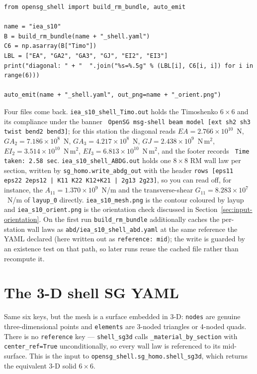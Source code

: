 \begin{lstlisting}[style=opensg,caption={The whole compute part of beam\_homo\_shell.py.},basicstyle=\ttfamily\footnotesize]
from opensg_shell import build_rm_bundle, auto_emit

name = "iea_s10"
B = build_rm_bundle(name + "_shell.yaml")
C6 = np.asarray(B["Timo"])
LBL = ["EA", "GA2", "GA3", "GJ", "EI2", "EI3"]
print("diagonal: " + "  ".join("%s=%.5g" % (LBL[i], C6[i, i]) for i in range(6)))

auto_emit(name + "_shell.yaml", out_png=name + "_orient.png")
\end{lstlisting}

Four files come back. \texttt{iea\_s10\_shell\_Timo.out} holds the Timoshenko
$6\times6$ and its compliance under the banner \texttt{ OpenSG msg-shell beam
model [ext sh2 sh3 twist bend2 bend3]}; for this station the diagonal reads
$EA = 2.766\times10^{10}$~N, $GA_2 = 7.186\times10^{8}$~N,
$GA_3 = 4.217\times10^{8}$~N, $GJ = 2.438\times10^{9}$~N\,m$^2$,
$EI_2 = 3.514\times10^{10}$~N\,m$^2$, $EI_3 = 6.813\times10^{10}$~N\,m$^2$, and
the footer records \texttt{ Time taken: 2.58 sec}.
\texttt{iea\_s10\_shell\_ABDG.out} holds one $8\times8$ RM wall law per section,
written by \texttt{sg\_homo.write\_abdg\_out} with the header
\texttt{rows [eps11 eps22 2eps12 | K11 K22 K12+K21 | 2g13 2g23]}, so you can read
off, for instance, the $A_{11} = 1.370\times10^{9}$~N/m and the transverse-shear
$G_{11} = 8.283\times10^{7}$~N/m of \texttt{layup\_0} directly.
\texttt{iea\_s10\_mesh.png} is the contour coloured by layup and
\texttt{iea\_s10\_orient.png} is the orientation check discussed in
Section~\ref{sec:input-orientation}. On the first run \texttt{build\_rm\_bundle}
additionally caches the per-station wall laws as
\texttt{abd/iea\_s10\_shell\_abd.yaml} at the same reference the YAML declared
(here written out as \texttt{reference: mid}); the write is guarded by an
existence test on that path, so later runs reuse the cached file rather than
recompute it.

\section{The 3-D shell SG YAML}
\label{sec:input-shell3d}

Same six keys, but the mesh is a surface embedded in 3-D: \texttt{nodes} are
genuine three-dimensional points and \texttt{elements} are 3-noded triangles or
4-noded quads. There is no \texttt{reference} key --- \texttt{shell\_sg3d} calls
\texttt{\_material\_by\_section} with \texttt{center\_ref=True} unconditionally,
so every wall law is referenced to its mid-surface. This is the input to
\texttt{opensg\_shell.sg\_homo.shell\_sg3d}, which returns the equivalent 3-D
solid $6\times6$.

